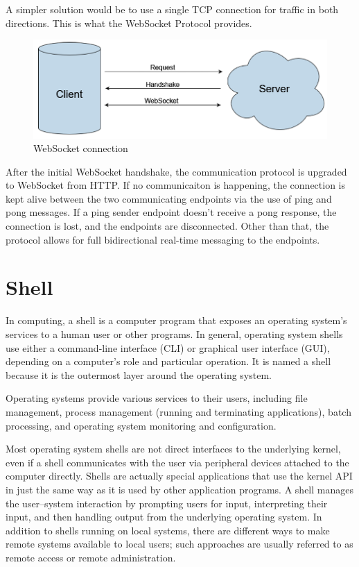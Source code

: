 	A simpler solution would be to use a single TCP connection for
	traffic in both directions.  This is what the WebSocket Protocol
	provides.

	\begin{figure}[h!]
		\includegraphics{include/imgs/websocket.PNG}
		\caption{WebSocket connection}
	\end{figure}

	After the initial WebSocket handshake, the communication protocol is upgraded to WebSocket from HTTP.
	If no communicaiton is happening, the connection is kept alive between the two communicating endpoints via the use of ping and pong messages.
	If a ping sender endpoint doesn't receive a pong response, the connection is lost, and the endpoints are disconnected.
	Other than that, the protocol allows for full bidirectional real-time messaging to the endpoints.

		

\section{Shell}
	In computing, a shell \cite{shell} is a computer program that exposes an operating system's services to a human user or other programs. 
	In general, operating system shells use either a command-line interface (CLI) or graphical user interface (GUI), 
	depending on a computer's role and particular operation. It is named a shell because it is the outermost layer around the operating system.

	Operating systems provide various services to their users, including file management, process management (running and terminating applications), batch processing, and operating system monitoring and configuration.

	Most operating system shells are not direct interfaces to the underlying kernel, even if a shell communicates with the user via peripheral devices 
	attached to the computer directly. Shells are actually special applications that use the kernel API in just the same way as it is used by 
	other application programs. A shell manages the user–system interaction by prompting users for input, interpreting their input, and then 
	handling output from the underlying operating system. In addition to shells running on local systems, there are different ways to make remote 
	systems available to local users; such approaches are usually referred to as remote access or remote administration.

